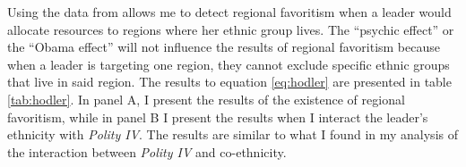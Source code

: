 \documentclass{wptemp}
\begin{document}
Using the data from \citet{hodler2014regional} allows me to detect regional favoritism when a leader would allocate resources to regions where her ethnic group lives. The ``psychic effect'' or the ``Obama effect'' will not influence the results of regional favoritism because when a leader is targeting one region, they cannot exclude specific ethnic groups that live in said region. The results to equation \ref{eq:hodler} are presented in table \ref{tab:hodler}. In panel A, I present the results of the existence of regional favoritism, while in panel B I present the results when I interact the leader's ethnicity with \textit{Polity IV}. The results are similar to what I found in my analysis of the interaction between \textit{Polity IV} and co-ethnicity.

\end{document}
